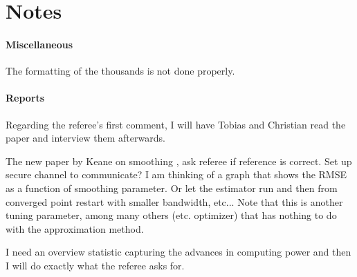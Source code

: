 \section{Notes}


\paragraph{Miscellaneous}

\begin{boenumerate}
\item The formatting of the thousands is not done properly.
\end{boenumerate}

\paragraph{Reports}

\begin{boenumerate}
\item Regarding the referee's first comment, I will have Tobias and Christian read the paper and interview them afterwards.
\item The new paper by Keane on smoothing \citep{Bruins.2015}, ask referee if reference is correct. Set up secure channel to communicate? I am thinking of a graph that shows the RMSE as a function of smoothing parameter. Or let the estimator run and then from converged point restart with smaller bandwidth, etc... Note that this is another tuning parameter, among many others (etc. optimizer) that has nothing to do with the approximation method.
\item I need an overview statistic capturing the advances in computing power and then I will do exactly what the referee asks for.
\end{boenumerate}
